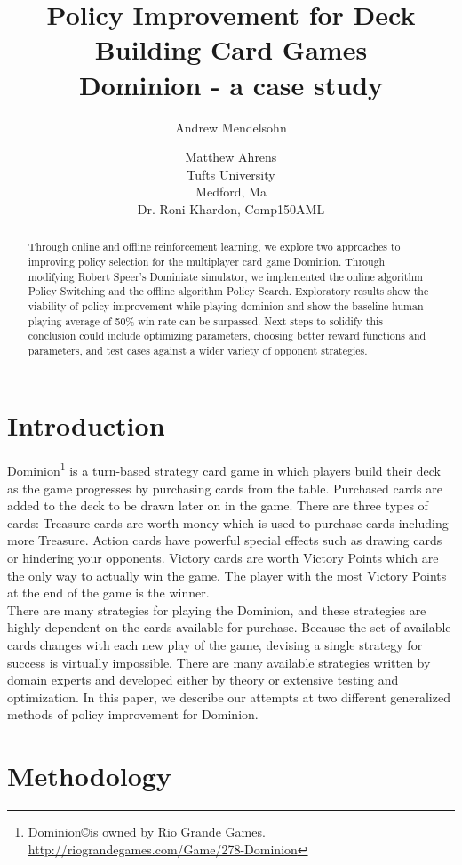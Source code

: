 \documentclass{article}
\title{Policy Improvement for Deck Building Card Games \\ Dominion - a case study}
\author{Andrew Mendelsohn \and Matthew Ahrens\\
Tufts University\\
Medford, Ma \\
Dr. Roni Khardon, Comp150AML
}
\begin{document}
\maketitle

\begin{abstract}
  Through online and offline reinforcement learning, we explore two approaches to improving policy selection for the multiplayer card game Dominion. Through modifying Robert Speer's Dominiate simulator, we implemented the online algorithm Policy Switching and the offline algorithm Policy Search. Exploratory results show the viability of policy improvement while playing dominion and show the baseline human playing average of 50\% win rate can be surpassed. Next steps to solidify this conclusion could include optimizing parameters, choosing better reward functions and parameters, and test cases against a wider variety of opponent strategies.
\end{abstract}

\section{Introduction}

Dominion\footnote{Dominion\copyright is owned by Rio Grande Games. \url{http://riograndegames.com/Game/278-Dominion}} is a turn-based strategy card game in which players build their deck as the game progresses by purchasing cards from the table. Purchased cards are added to the deck to be drawn later on in the game. There are three types of cards: Treasure cards are worth money which is used to purchase cards including more Treasure. Action cards have powerful special effects such as drawing cards or hindering your opponents. Victory cards are worth Victory Points which are the only way to actually win the game. The player with the most Victory Points at the end of the game is the winner.
\\
There are many strategies for playing the Dominion, and these strategies are highly dependent on the cards available for purchase. Because the set of available cards changes with each new play of the game, devising a single strategy for success is virtually impossible. There are many available strategies written by domain experts and developed either by theory or extensive testing and optimization. In this paper, we describe our attempts at two different generalized methods of policy improvement for Dominion.
\section{Methodology}
\end{document}
